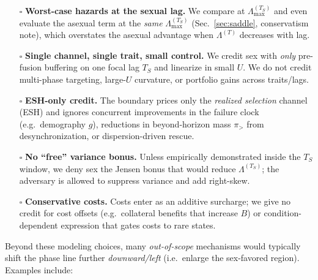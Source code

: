 \documentclass[11pt]{article}
\theoremstyle{upright}
\newcommand{\hazT}[1]{\Lambda^{(#1)}}          %
\newcommand{\hazmaxT}[1]{\Lambda^{(#1)}_{\max}}%
\begin{document}
\begin{itemize}[leftmargin=1.25em]
\item[$\square$] \textbf{Worst-case hazards at the sexual lag.} We compare at $\hazmaxT{T_S}$ and even evaluate the asexual term at the \emph{same} $\hazmaxT{T_S}$ (Sec.~\ref{sec:saddle}, conservatism note), which overstates the asexual advantage when $\hazT{T}$ decreases with lag.
\item[$\square$] \textbf{Single channel, single trait, small control.} We credit sex with \emph{only} pre-fusion buffering on one focal lag $T_S$ and linearize in small $U$. We do not credit multi-phase targeting, large-$U$ curvature, or portfolio gains across traits/lags.
\item[$\square$] \textbf{ESH-only credit.} The boundary prices only the \emph{realized selection} channel (ESH) and ignores concurrent improvements in the failure clock (e.g.\ demography $g$), reductions in beyond-horizon mass $\pi_{>}$ from desynchronization, or dispersion-driven rescue.
\item[$\square$] \textbf{No “free” variance bonus.} Unless empirically demonstrated inside the $T_S$ window, we deny sex the Jensen bonus that would reduce $\hazT{T_S}$; the adversary is allowed to suppress variance and add right-skew.
\item[$\square$] \textbf{Conservative costs.} Costs enter as an additive surcharge; we give no credit for cost offsets (e.g.\ collateral benefits that increase $B$) or condition-dependent expression that gates costs to rare states.
\end{itemize}

\noindent Beyond these modeling choices, many \emph{out-of-scope} mechanisms would typically shift the phase line further
\emph{downward/left} (i.e.\ enlarge the sex-favored region). Examples include:
\end{document}
